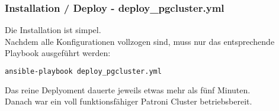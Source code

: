 \begin{flushleft}
    \subsubsection{Installation / Deploy - deploy\_pgcluster.yml}
    Die Installation ist simpel.\\
    Nachdem alle Konfigurationen vollzogen sind, muss nur das entsprechende Playbook ausgeführt werden:
    \lstset{style=gra_codestyle}
    \begin{lstlisting}[language=bash, caption=Deploy - deploy\_pgcluster.yml,captionpos=b,label={lst:deploy-pgcluster},breaklines=true]
ansible-playbook deploy_pgcluster.yml
    \end{lstlisting}
    Das reine Deplyoment dauerte jeweils etwas mehr als fünf Minuten.\\
    Danach war ein voll funktionsfähiger Patroni Cluster betriebsbereit.

\end{flushleft}
